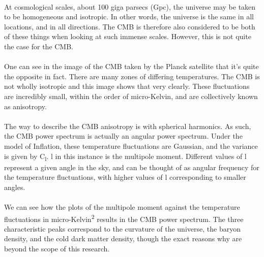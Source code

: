 \documentclass[twoside, fontsize=12pt,
     bibliography=totoc, %
     listof=totoc, %
     index=totoc, %
     onehalfspacing %
]{_MScDiss2017_cls}
\begin{document}
\paragraph{}

At cosmological scales, about 100 giga parsecs (Gpc), the universe may be taken to be homogeneous and isotropic. In other words, the universe is the same in all locations, and in all directions. The CMB is therefore also considered to be both of these things when looking at such immense scales. However, this is not quite the case for the CMB.

\paragraph{}

One can see in the image of the CMB taken by the Planck satellite that it's quite the opposite in fact. There are many zones of differing temperatures. The CMB is not wholly isotropic and this image shows that very clearly. These fluctuations are incredibly small, within the order of micro-Kelvin, and are collectively known as anisotropy.

\paragraph{}

The way to describe the CMB anisotropy is with spherical harmonics. As such, the CMB power spectrum is actually an angular power spectrum. Under the model of Inflation, these temperature fluctuations are Gaussian, and the variance is given by C\textsubscript{l}. l in this instance is the multipole moment. Different values of l represent a given angle in the sky, and can be thought of as angular frequency for the temperature fluctuations, with higher values of l corresponding to smaller angles.

\paragraph{}

We can see how the plots of the multipole moment against the temperature fluctuations in micro-Kelvin\textsuperscript{2} results in the CMB power spectrum. The three characteristic peaks correspond to the curvature of the universe, the baryon density, and the cold dark matter density, though the exact reasons why are beyond the scope of this research.

\paragraph{}
\end{document}
